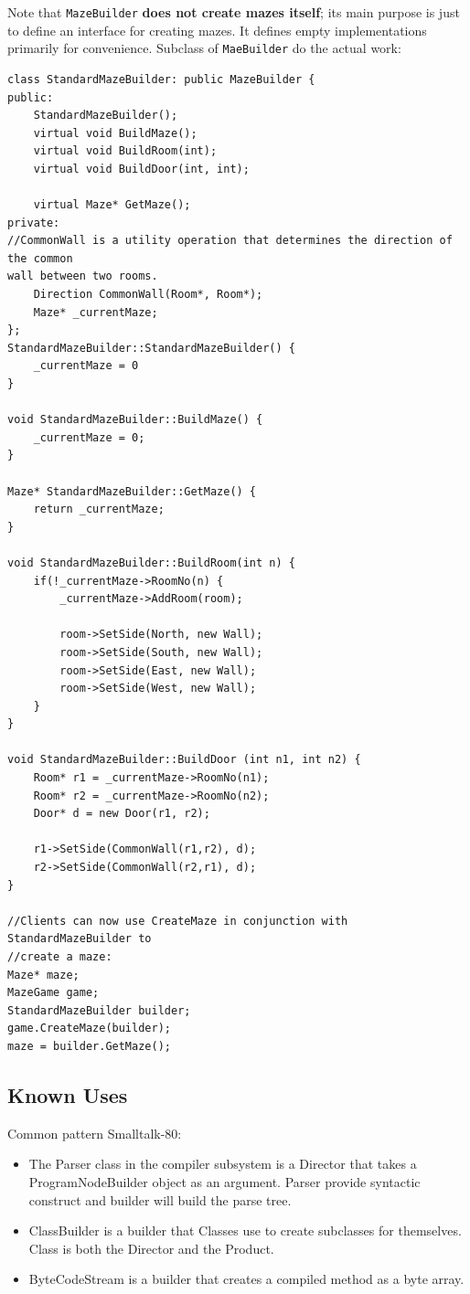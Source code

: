 \documentclass[11pt, a4paper]{book}
\begin{document}
Note that \verb|MazeBuilder| \textbf{does not create mazes itself}; its main
purpose is just to define an interface for creating mazes. It defines empty
implementations primarily for convenience. Subclass of \verb|MaeBuilder| do the
actual work:
\begin{verbatim}
class StandardMazeBuilder: public MazeBuilder {
public:
    StandardMazeBuilder();
    virtual void BuildMaze();
    virtual void BuildRoom(int);
    virtual void BuildDoor(int, int);

    virtual Maze* GetMaze();
private:
//CommonWall is a utility operation that determines the direction of the common
wall between two rooms.
    Direction CommonWall(Room*, Room*);
    Maze* _currentMaze;
};
StandardMazeBuilder::StandardMazeBuilder() {
    _currentMaze = 0
}

void StandardMazeBuilder::BuildMaze() {
    _currentMaze = 0;
}

Maze* StandardMazeBuilder::GetMaze() {
    return _currentMaze;
}

void StandardMazeBuilder::BuildRoom(int n) {
    if(!_currentMaze->RoomNo(n) {
        _currentMaze->AddRoom(room);

        room->SetSide(North, new Wall);
        room->SetSide(South, new Wall);
        room->SetSide(East, new Wall);
        room->SetSide(West, new Wall);
    }
}

void StandardMazeBuilder::BuildDoor (int n1, int n2) {
    Room* r1 = _currentMaze->RoomNo(n1);
    Room* r2 = _currentMaze->RoomNo(n2);
    Door* d = new Door(r1, r2);

    r1->SetSide(CommonWall(r1,r2), d);
    r2->SetSide(CommonWall(r2,r1), d);
}

//Clients can now use CreateMaze in conjunction with StandardMazeBuilder to
//create a maze:
Maze* maze;
MazeGame game;
StandardMazeBuilder builder;
game.CreateMaze(builder);
maze = builder.GetMaze();
\end{verbatim}

\subsection{Known Uses}
Common pattern Smalltalk-80:
\begin{itemize}
    \item The Parser class in the compiler subsystem is a Director that takes a
    ProgramNodeBuilder object as an argument. Parser provide syntactic construct
    and builder will build the parse tree.
    \item ClassBuilder is a builder that Classes use to create subclasses for
    themselves. Class is both the Director and the Product.
    \item ByteCodeStream is a builder that creates a compiled method as a byte
    array.
\end{itemize}
\end{document}
